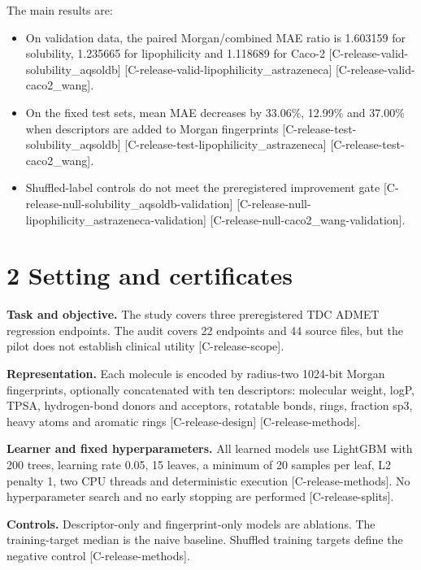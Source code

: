 \documentclass[10pt,twocolumn]{article}
\begin{document}
The main results are:

\begin{itemize}
\item On validation data, the paired Morgan/combined MAE ratio is 1.603159 for solubility, 1.235665 for lipophilicity and 1.118689 for Caco-2 {\scriptsize[C-release-valid-solubility\_aqsoldb]} {\scriptsize[C-release-valid-lipophilicity\_astrazeneca]} {\scriptsize[C-release-valid-caco2\_wang]}.
\item On the fixed test sets, mean MAE decreases by 33.06\%, 12.99\% and 37.00\% when descriptors are added to Morgan fingerprints {\scriptsize[C-release-test-solubility\_aqsoldb]} {\scriptsize[C-release-test-lipophilicity\_astrazeneca]} {\scriptsize[C-release-test-caco2\_wang]}.
\item Shuffled-label controls do not meet the preregistered improvement gate {\scriptsize[C-release-null-solubility\_aqsoldb-validation]} {\scriptsize[C-release-null-lipophilicity\_astrazeneca-validation]} {\scriptsize[C-release-null-caco2\_wang-validation]}.
\end{itemize}

\section{2 Setting and certificates}

\textbf{Task and objective.} The study covers three preregistered TDC ADMET regression endpoints. The audit covers 22 endpoints and 44 source files, but the pilot does not establish clinical utility {\scriptsize[C-release-scope]}.

\textbf{Representation.} Each molecule is encoded by radius-two 1024-bit Morgan fingerprints, optionally concatenated with ten descriptors: molecular weight, logP, TPSA, hydrogen-bond donors and acceptors, rotatable bonds, rings, fraction sp3, heavy atoms and aromatic rings {\scriptsize[C-release-design]} {\scriptsize[C-release-methods]}.

\textbf{Learner and fixed hyperparameters.} All learned models use LightGBM with 200 trees, learning rate 0.05, 15 leaves, a minimum of 20 samples per leaf, L2 penalty 1, two CPU threads and deterministic execution {\scriptsize[C-release-methods]}. No hyperparameter search and no early stopping are performed {\scriptsize[C-release-splits]}.

\textbf{Controls.} Descriptor-only and fingerprint-only models are ablations. The training-target median is the naive baseline. Shuffled training targets define the negative control {\scriptsize[C-release-methods]}.
\end{document}
